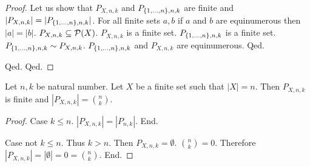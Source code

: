 \documentclass{article}
\begin{document}
\begin{forthel}
\begin{proof}
Let us show that $P_{X,n,k}$ and $P_{\{1,\dots,n\},n,k}$ are finite and $|P_{X,n,k}|=|P_{\{1,\dots,n\},n,k}|$.
For all finite sets $a,b$ if $a$ and $b$ are equinumerous then $|a|=|b|$.
$P_{X,n,k} \subseteq {\cal P}(X)$.
$P_{X,n,k}$ is a finite set.
$P_{\{1,\dots,n\},n,k}$ is a finite set.
$P_{\{1,\dots,n\},n,k} \sim P_{X,n,k}$.
$P_{\{1,\dots,n\},n,k}$ and $P_{X,n,k}$ are equinumerous.
Qed.

Qed.
Qed.
\end{proof}

\begin{theorem}
Let $n,k$ be natural number.
Let $X$ be a finite set such that $|X|=n$.
Then $P_{X,n,k}$ is finite and $|P_{X,n,k}|=\binom{n}{k}$.
\end{theorem}
\begin{proof}
Case $k \leq n$.
$|P_{X,n,k}|=|P_{n,k}|$.
End.

Case not $k \leq n$.
Thus $k > n$.
Then $P_{X,n,k} = \emptyset$.
$\binom{n}{k}=0$.
Therefore $|P_{X,n,k}| = |\emptyset| = 0 = \binom{n}{k}$.
End.
\end{proof}


\end{forthel}
\end{document}
